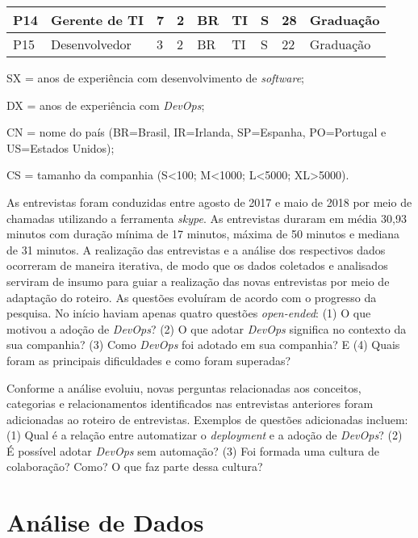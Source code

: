 \begin{table}[t]
\begin{tabular}{|p{0.6cm}|p{3.4cm}|p{0.5cm}|p{0.5cm}|p{0.5cm}|p{1.7cm}|p{0.5cm}|p{1cm}|p{2.7cm}|}
P14 & Gerente de \acrshort{TI} & 7 & 2 & BR & \acrshort{TI} & S & 28 & Graduação \\ \hline \centering

P15 & Desenvolvedor & 3 & 2 & BR & \acrshort{TI} & S & 22 & Graduação \\ \hline
\end{tabular}
\begin{tablenotes}
  \footnotesize \centering
  \item SX = anos de experiência com desenvolvimento de {\it software};
  \item DX = anos de experiência com {\it DevOps};
  \item CN = nome do país (BR=Brasil, IR=Irlanda, SP=Espanha, PO=Portugal e US=Estados Unidos);
  \item CS = tamanho da companhia (S\textless100; M\textless1000; L\textless5000; XL\textgreater5000).
\end{tablenotes}
\end{table}


As entrevistas foram conduzidas entre agosto de 2017 e maio de 2018 por meio de
chamadas utilizando a ferramenta {\it skype}. As entrevistas duraram em média 30,93 minutos
com duração mínima de 17 minutos, máxima de 50 minutos e mediana de 31 minutos.
A realização das entrevistas e a análise dos respectivos dados ocorreram de
maneira iterativa, de modo que os dados coletados e analisados serviram de
insumo para guiar a realização das novas entrevistas por meio de adaptação do
roteiro. As questões evoluíram de acordo com o progresso da pesquisa. No início
haviam apenas quatro questões {\it open-ended}: (1) O que motivou a adoção de
{\it DevOps}? (2) O que adotar {\it DevOps} significa no contexto da sua
companhia? (3) Como {\it DevOps} foi adotado em sua companhia? E (4) Quais foram
as principais dificuldades e como foram superadas?

Conforme a análise evoluiu, novas perguntas relacionadas aos
conceitos, categorias e relacionamentos identificados nas entrevistas anteriores
foram adicionadas ao roteiro de entrevistas.
Exemplos de questões adicionadas incluem: (1) Qual é a relação entre automatizar o
{\it deployment} e a adoção de {\it DevOps}? (2) É possível adotar {\it DevOps}
sem automação? (3) Foi formada uma cultura de colaboração? Como? O que faz parte
dessa cultura?

\section{Análise de Dados}

